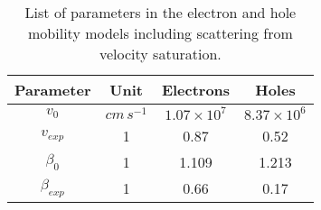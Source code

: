 \begin{table}[!h]
\centering
\begin{tabular}{cccc}
\toprule
Parameter & Unit & Electrons & Holes \\
\midrule
$v_0$ & $cm\,s^{-1}$ & $1.07\times 10^{7}$ & $8.37\times 10^{6}$\\
$v_{exp}$ & 1 & 0.87 & 0.52\\
$\beta_0$ & 1 & 1.109 & 1.213 \\
$\beta_{exp}$ & 1 & 0.66 & 0.17\\
\bottomrule
\end{tabular}
\caption{List of parameters in the electron and hole mobility models including scattering from velocity saturation.}
\end{table}

